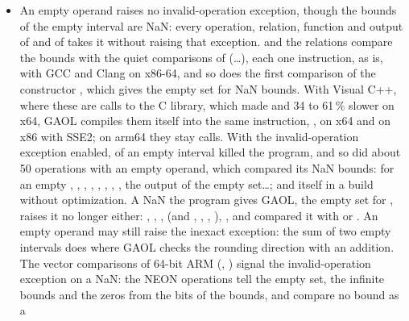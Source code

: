 \begin{itemize}
  the check is exact and raises no flag at all, the inexact one included. With
  the NEON
  intervals the check is a read of FPCR (), which raises no
  flag: \code{+}, \code{-}, \code{/} and  raise the inexact one
  only when a bound they compute is rounded, \code{*},  and
  , which is , also when a corner product that is
  not a bound of the result is (\code{[-a, 128] * [-a, 4]} for
  $a = 1 + 2^{-52}$ has the exact bounds $-128a$ and 512, and the corner
  $a^2$ is rounded).\newinvfive
\item An empty operand raises no invalid-operation exception, though the
  bounds of the empty interval are NaN: every operation, relation, function
  and output of  and of  takes it
  without raising that exception.  and the relations
  compare the bounds with the quiet comparisons of 
  (\dots), each one instruction, as \code{<=} is,
  with GCC and Clang on x86-64, and so does the first comparison of the
  constructor , which gives the empty set for NaN bounds.
  With Visual C++, where these are calls to the C library, which made
   and  34 to 61\,\% slower on x64, GAOL compiles
  them itself into the same instruction, , on x64 and on x86
  with SSE2; on arm64 they stay calls. With the invalid-operation exception
  enabled,  of an empty interval killed the program, and so
  did about 50 operations with an empty operand, which compared its NaN
  bounds:  for an empty , , ,
  , , , ,
  , the output of the empty set\dots; and
   itself in a build without optimization. A NaN
  the program gives GAOL, the empty set for , raises it no
  longer either: , ,
  ,  (and \code{-=}, \code{*=}, \code{/=},
  \code{\%=}), ,  and 
  compared it with \code{<} or \code{<=}. An empty operand may still raise
  the inexact exception: the sum of two empty intervals does where GAOL
  checks the rounding direction with an addition. The vector comparisons of
  64-bit ARM (, ) signal the invalid-operation
  exception on a NaN: the NEON operations tell the empty set, the infinite
  bounds and the zeros from the bits of the bounds, and compare no bound as a

\end{itemize}
